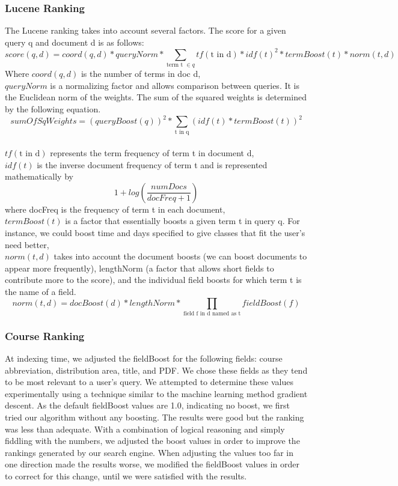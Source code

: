 \documentclass[12pt,letterpaper]{article}
\begin{document}
\subsubsection{Lucene Ranking}
The Lucene ranking takes into account several factors. The score for a given query q and document d is as follows:
\begin{equation}
  score(q,d) = coord(q,d) * queryNorm * \sum_{\text{term t } \in q}{tf(\text{t in d}) * idf(t)^2 * termBoost(t) * norm(t,d)}
  \label{eq:practical}
\end{equation}
Where $coord(q,d)$ is the number of terms in doc d,\\
$queryNorm$ is a normalizing factor and allows comparison between queries. It is the Euclidean norm of the weights. The sum of the squared weights is determined by the following equation. \[ sumOfSqWeights = (queryBoost(q))^2 * \sum_{\text{t in q}}{(idf(t) * termBoost(t))^2}\]\\
$tf(\text{t in d})$ represents the term frequency of term t in document d, \\
$idf(t)$ is the inverse document frequency of term t and is represented mathematically by \[ 1 + log(\frac{numDocs}{docFreq + 1}) \] where docFreq is the frequency of term t in each document, \\
$termBoost(t)$ is a factor that essentially boosts a given term t in query q. For instance, we could boost time and days specified to give classes that fit the user's need better,\\
$norm(t, d)$ takes into account the document boosts (we can boost documents to appear more frequently), lengthNorm (a factor that allows short fields to contribute more to the score), and the individual field boosts for which term t is the name of a field. 
\[ norm(t,d) = docBoost(d) * lengthNorm * \prod_{\text{field f in d named as t}}{fieldBoost(f)} \] 				

\subsubsection{Course Ranking}
At indexing time, we adjusted the fieldBoost for the following fields: course abbreviation, distribution area, title, and PDF. We chose these fields as they tend to be most relevant to a user's query. We attempted to determine these values experimentally using a technique similar to the machine learning method gradient descent. As the default fieldBoost values are 1.0, indicating no boost, we first tried our algorithm without any boosting. The results were good but the ranking was less than adequate.
With a combination of logical reasoning and simply fiddling with the numbers, we adjusted the boost values in order to improve the rankings generated by our search engine. When adjusting the values too far in one direction made the results worse, we modified the fieldBoost values in order to correct for this change, until we were satisfied with the results.
\end{document}
